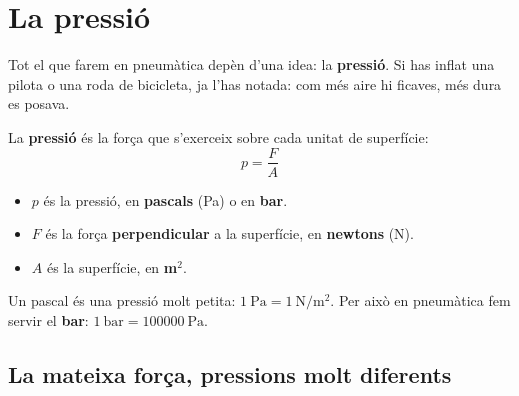 \section{La pressió}

Tot el que farem en pneumàtica depèn d'una idea: la \textbf{pressió}. Si has inflat una pilota o una roda de bicicleta, ja l'has notada: com més aire hi ficaves, més dura es posava.

\begin{idea}
La \textbf{pressió} és la força que s'exerceix sobre cada unitat de superfície:
\[ p = \frac{F}{A} \]
\begin{itemize}
 \item $p$ és la pressió, en \textbf{pascals} (\si{\pascal}) o en \textbf{bar}.
 \item $F$ és la força \textbf{perpendicular} a la superfície, en \textbf{newtons} (\si{\newton}).
 \item $A$ és la superfície, en \textbf{m$^2$}.
\end{itemize}
Un pascal és una pressió molt petita: $\SI{1}{\pascal} = \SI{1}{\newton\per\meter\squared}$. Per això en pneumàtica fem servir el \textbf{bar}: $\SI{1}{\bar} = \SI{100000}{\pascal}$.
\end{idea}

\subsection*{La mateixa força, pressions molt diferents}

\begin{center}
\end{center}

